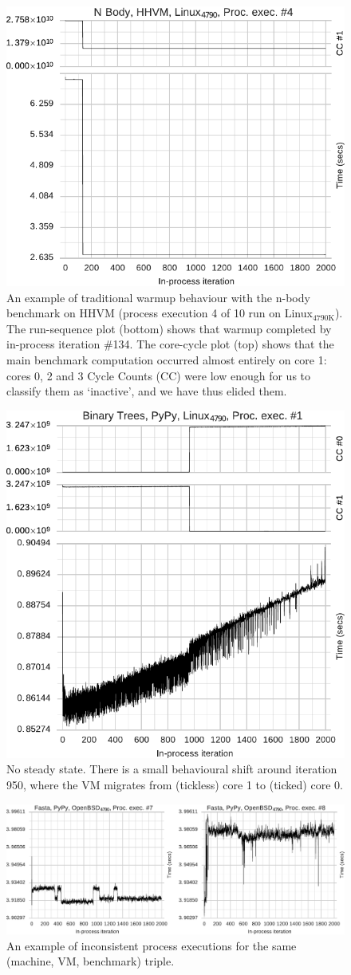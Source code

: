 \documentclass[preprint,numbers,10pt]{sigplanconf}
\newcommand{\bencherthree}{Linux$_\mathrm{4790K}$\xspace}
\begin{document}
\begin{figure}[t]
\centering
\includegraphics[width=.45\textwidth]{examples/new_warmup_no_migrate.pdf}
\caption{An example of traditional warmup behaviour with the n-body benchmark on
HHVM (process execution 4 of 10 run on \bencherthree). The run-sequence plot
(bottom) shows that warmup completed by in-process iteration \#134. The
core-cycle plot (top) shows that the main benchmark computation
occurred almost entirely on core 1: cores 0, 2 and 3 Cycle Counts (CC)
were low enough for us to classify them as `inactive', and we have thus elided them.}
\label{fig:examples:trad}
\vspace{-.2cm}
\end{figure}

\begin{figure}[t]
\centering
\includegraphics[width=.45\textwidth]{examples/new_no_steady.pdf}
\caption{No steady state. There is a small behavioural shift around iteration
950, where the VM migrates from (tickless) core 1 to (ticked) core 0.}
\label{fig:examples:nosteadystate}
\end{figure}

\begin{figure}[t!]
\centering
\includegraphics[width=.8\textwidth]{examples/new_inconsistent.pdf}
\caption{An example of inconsistent process executions for the same (machine, VM, benchmark) triple.}
\label{fig:examples:inconsistent}
\vspace{-.4cm}
\end{figure}
\end{document}
